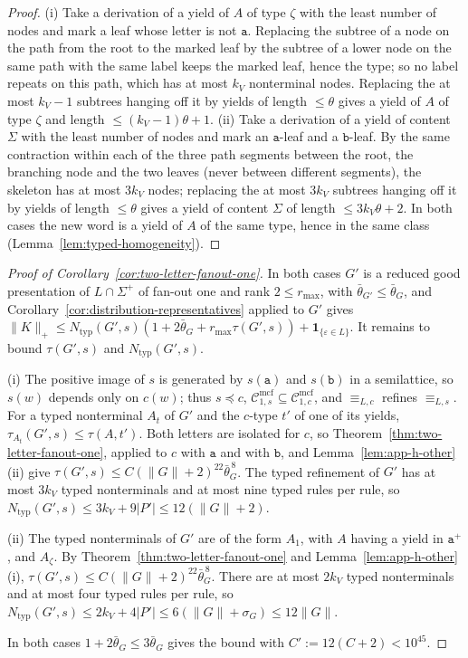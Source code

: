 \documentclass[11pt]{article}
\numberwithin{equation}{section}
\theoremstyle{plain}
\theoremstyle{definition}
\theoremstyle{remark}
\newcommand{\Cmcf}[2]{\mathcal{C}^{\mathrm{mcf}}_{#1,#2}}
\newcommand{\eps}{\varepsilon}
\theoremstyle{plain}
\begin{document}
\begin{proof}
(i) Take a derivation of a yield of $A$ of type $\zeta$ with the least number of
nodes and mark a leaf whose letter is not $\mathtt a$.  Replacing the subtree of a
node on the path from the root to the marked leaf by the subtree of a lower node
on the same path with the same label keeps the marked leaf, hence the type; so no label repeats on
this path, which has at most $k_V$ nonterminal nodes.  Replacing the at most
$k_V-1$ subtrees hanging off it by yields of length $\le\theta$ gives a yield of
$A$ of type $\zeta$ and length $\le(k_V-1)\theta+1$.  (ii) Take a derivation of a
yield of content $\Sigma$ with the least number of nodes and mark an $\mathtt
a$-leaf and a $\mathtt b$-leaf.  By the same contraction within each of the three
path segments between the root, the branching node and the two leaves (never
between different segments), the skeleton has at most
$3k_V$ nodes; replacing the at most $3k_V$ subtrees hanging off it by yields of
length $\le\theta$ gives a yield of content $\Sigma$ of length $\le3k_V\theta+2$.
In both cases the new word is a yield of $A$ of the same type, hence in the same
class (Lemma~\ref{lem:typed-homogeneity}).
\end{proof}

\begin{proof}[Proof of Corollary~\ref{cor:two-letter-fanout-one}]
In both cases $G'$ is a reduced good presentation of $L\cap\Sigma^+$ of fan-out
one and rank $2\le r_{\max}$, with $\bar\theta_{G'}\le\bar\theta_G$, and
Corollary~\ref{cor:distribution-representatives} applied to $G'$ gives
$\|K\|_+\le N_{\mathrm{typ}}(G',s)(1+2\bar\theta_G+r_{\max}\tau(G',s))
+\mathbf 1_{\{\eps\in L\}}$.  It remains to bound $\tau(G',s)$ and
$N_{\mathrm{typ}}(G',s)$.

(i) The positive image of $s$ is generated by $s(\mathtt a)$ and $s(\mathtt b)$ in a
semilattice, so $s(w)$ depends only on $c(w)$; thus $s\preceq c$,
$\Cmcf{1}{s}\subseteq\Cmcf{1}{c}$, and $\equiv_{L,c}$ refines $\equiv_{L,s}$.
For a typed nonterminal $A_t$ of $G'$ and the $c$-type $t'$ of one of its
yields, $\tau_{A_t}(G',s)\le\tau(A,t')$.  Both letters are isolated for $c$, so
Theorem~\ref{thm:two-letter-fanout-one}, applied to $c$ with $\mathtt a$ and with
$\mathtt b$, and Lemma~\ref{lem:app-h-other}(ii) give
$\tau(G',s)\le C(\|G\|+2)^{22}\bar\theta_G^{\,8}$.  The typed refinement of $G'$
has at most $3k_V$ typed nonterminals and at most nine typed rules per rule, so
$N_{\mathrm{typ}}(G',s)\le3k_V+9|P'|\le12(\|G\|+2)$.

(ii) The typed nonterminals of $G'$ are of the form $A_1$, with $A$ having a
yield in $\mathtt a^+$, and $A_\zeta$.  By
Theorem~\ref{thm:two-letter-fanout-one} and Lemma~\ref{lem:app-h-other}(i),
$\tau(G',s)\le C(\|G\|+2)^{22}\bar\theta_G^{\,8}$.  There are at most $2k_V$ typed
nonterminals and at most four typed rules per rule, so
$N_{\mathrm{typ}}(G',s)\le2k_V+4|P'|\le6(\|G\|+\sigma_G)\le12\|G\|$.

In both cases $1+2\bar\theta_G\le3\bar\theta_G$ gives the bound with
$C':=12(C+2)<10^{45}$.
\end{proof}
\end{document}
